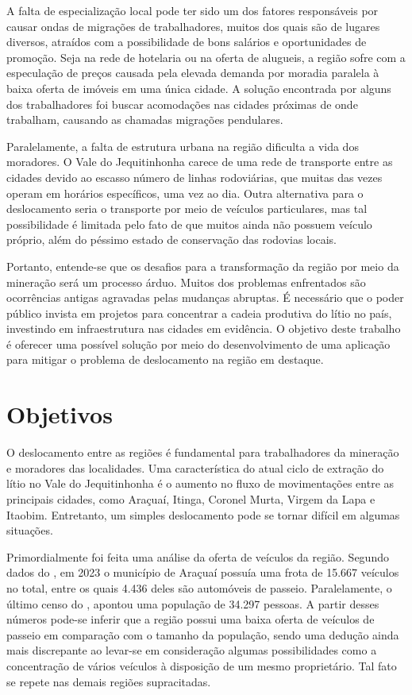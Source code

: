 A falta de especialização local pode ter sido um dos fatores responsáveis por causar ondas de migrações de trabalhadores, muitos dos quais são de lugares diversos, atraídos com a possibilidade de bons salários e oportunidades de promoção. Seja na rede de hotelaria ou na oferta de alugueis, a região sofre com a especulação de preços causada pela elevada demanda por moradia paralela à baixa oferta de imóveis em uma única cidade. A solução encontrada por alguns dos trabalhadores foi buscar acomodações nas cidades próximas de onde trabalham, causando as chamadas migrações pendulares.

Paralelamente, a falta de estrutura urbana na região dificulta a vida dos moradores. O Vale do Jequitinhonha carece de uma rede de transporte entre as cidades devido ao escasso número de linhas rodoviárias, que muitas das vezes operam em horários específicos, uma vez ao dia. Outra alternativa para o deslocamento seria o transporte por meio de veículos particulares, mas tal possibilidade é limitada pelo fato de que muitos ainda não possuem veículo próprio, além do péssimo estado de conservação das rodovias locais.

Portanto, entende-se que os desafios para a transformação da região por meio da mineração será um processo árduo. Muitos dos problemas enfrentados são ocorrências antigas agravadas pelas mudanças abruptas. É necessário que o poder público invista em projetos para concentrar a cadeia produtiva do lítio no país, investindo em infraestrutura nas cidades em evidência. O objetivo deste trabalho é oferecer uma possível solução por meio do desenvolvimento de uma aplicação para mitigar o problema de deslocamento na região em destaque.

\section{Objetivos}

O deslocamento entre as regiões é fundamental para trabalhadores da mineração e moradores das localidades. Uma característica do atual ciclo de extração do lítio no Vale do Jequitinhonha é o aumento no fluxo de movimentações entre as principais cidades, como Araçuaí, Itinga, Coronel Murta, Virgem da Lapa e Itaobim. Entretanto, um simples deslocamento pode se tornar difícil em algumas situações.

Primordialmente foi feita uma análise da oferta de veículos da região. Segundo dados do  , em 2023 o município de Araçuaí possuía uma frota de 15.667 veículos no total, entre os quais 4.436 deles são automóveis de passeio. Paralelamente, o último censo do , apontou uma população de 34.297 pessoas. A partir desses números pode-se inferir que a região possui uma baixa oferta de veículos de passeio em comparação com o tamanho da população, sendo uma dedução ainda mais discrepante ao levar-se em consideração algumas possibilidades como a concentração de vários veículos à disposição de um mesmo proprietário. Tal fato se repete nas demais regiões supracitadas.

